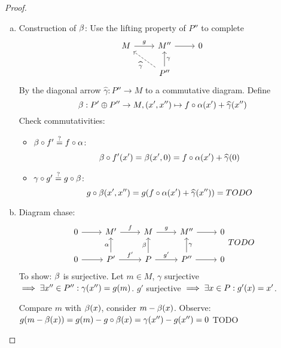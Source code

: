 \documentclass[a4paper]{report}
\begin{document}
\begin{proof}
\begin{enumerate}[(a)]
  \item Construction of $\beta$: Use the lifting property of $P''$ to complete
        \[\begin{tikzcd}
M \arrow[r, "g"] & M'' \arrow[r]                                               & 0 \\
                 & P'' \arrow[u, "\gamma"'] \arrow[lu, "\hat \gamma ", dashed] &
               \end{tikzcd}\]
        By the diagonal arrow $\hat \gamma : P'' \to M$ to a commutative diagram. Define \[\beta : P' \oplus P'' \to M, (x',x'') \mapsto f \circ \alpha(x') + \widehat \gamma (x'')\]
        Check commutativities:
        \begin{itemize}
          \item $\beta \circ f' \overset ? = f \circ \alpha$: \[\beta \circ f' (x') = \beta(x',0) = f \circ \alpha(x') + \widehat \gamma(0)\]
          \item $\gamma \circ g' \overset ?= g \circ \beta$:
                \[g \circ \beta(x',x'') = g(f \circ \alpha(x') + \widehat \gamma(x'')) = TODO
                \]

        \end{itemize}
  \item Diagram chase:
        \[\begin{tikzcd}
0 \arrow[r] & M' \arrow[r, "f"]                      & M \arrow[r, "g"]                     & M'' \arrow[r]                      & 0 \\
0 \arrow[r] & P' \arrow[r, "f'"] \arrow[u, "\alpha"] & P \arrow[r, "g'"] \arrow[u, "\beta"] & P'' \arrow[u, "\gamma"'] \arrow[r] & 0
\end{tikzcd} TODO\]
        To show: $\beta$ is surjective. Let $m \in M$, $\gamma$ surjective $\implies \exists x'' \in P'' : \gamma(x'') = g(m)$.
        $g'$ surjective $\implies \exists x \in P : g'(x) = x'$.

        Compare $m$ with $\beta(x)$, consider $m - \beta(x)$. Observe: $g(m-\beta(x)) = g(m) - g \circ \beta(x) = \gamma(x'') - g(x'') = 0$ TODO %
\end{enumerate}
\end{proof}
\end{document}
